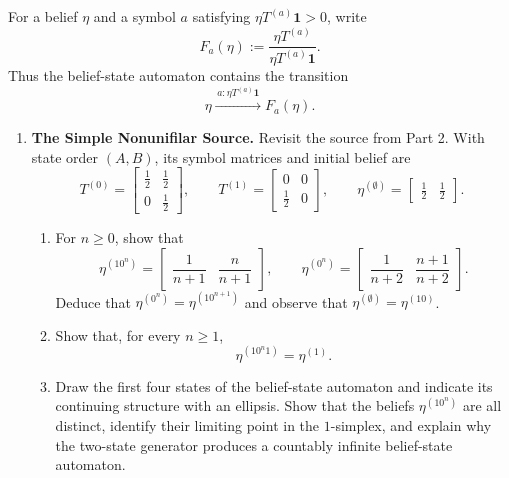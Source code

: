 \documentclass[11pt]{article}
\begin{document}
\begin{exercise}
\label{ex:p3-3}
  For a belief $\eta$ and a symbol $a$ satisfying
  $\eta T^{(a)}\mathbf 1>0$, write
  \[
    F_a(\eta):=\frac{\eta T^{(a)}}{\eta T^{(a)}\mathbf 1}.
  \]
  Thus the belief-state automaton contains the transition
  \[
    \eta\xrightarrow{\,a:\eta T^{(a)}\mathbf 1\,}F_a(\eta).
  \]

  \begin{enumerate}
    \item \textbf{The Simple Nonunifilar Source.}
      Revisit the source from Part 2. With state order $(A,B)$, its symbol
      matrices and initial belief are
      \[
        T^{(0)}=
        \begin{bmatrix}\tfrac12&\tfrac12\\0&\tfrac12\end{bmatrix},
        \qquad
        T^{(1)}=
        \begin{bmatrix}0&0\\\tfrac12&0\end{bmatrix},
        \qquad
        \eta^{(\emptyset)}=\begin{bmatrix}\tfrac12&\tfrac12\end{bmatrix}.
      \]
      \begin{enumerate}
        \item For $n\geq0$, show that
          \[
            \eta^{(10^n)}=
              \begin{bmatrix}\dfrac1{n+1}&\dfrac n{n+1}\end{bmatrix},
            \qquad
            \eta^{(0^n)}=
              \begin{bmatrix}\dfrac1{n+2}&\dfrac{n+1}{n+2}\end{bmatrix}.
          \]
          Deduce that
          $\eta^{(0^n)}=\eta^{(10^{n+1})}$ and observe that
          $\eta^{(\emptyset)}=\eta^{(10)}$.

        \item Show that, for every $n\geq1$,
          \[
            \eta^{(10^n1)}=\eta^{(1)}.
          \]

        \item Draw the first four states of the belief-state automaton and
          indicate its continuing structure with an ellipsis. Show that the
          beliefs $\eta^{(10^n)}$ are all distinct, identify their limiting
          point in the $1$-simplex, and explain why the two-state generator
          produces a countably infinite belief-state automaton.
      \end{enumerate}


\end{enumerate}
\end{exercise}
\end{document}
